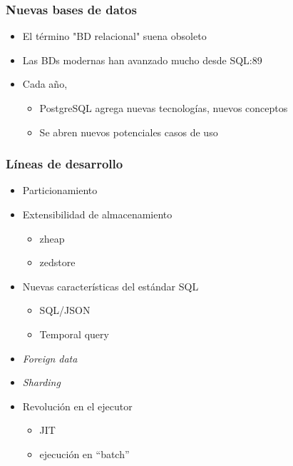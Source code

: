 \begin{frame}
\frametitle{Nuevas bases de datos}

\vfill
\begin{itemize}
\item El término "BD relacional" suena obsoleto
\item Las BDs modernas han avanzado mucho desde SQL:89
\item Cada año,
\begin{itemize}
\item PostgreSQL agrega nuevas tecnologías, nuevos conceptos
\item Se abren nuevos potenciales casos de uso
\end{itemize}
\end{itemize}
\vfill
\end{frame}

\begin{frame}
\frametitle{Líneas de desarrollo}

\begin{itemize}
\item Particionamiento

\item Extensibilidad de almacenamiento
\begin{itemize}
\item zheap
\item zedstore
\end{itemize}

\item Nuevas características del estándar SQL
\begin{itemize}
\item SQL/JSON
\item Temporal query
\end{itemize}

\item \textit{Foreign data}

\item \textit{Sharding}

\item Revolución en el ejecutor
\begin{itemize}
\item JIT
\item ejecución en ``batch''
\end{itemize}

\end{itemize}

\end{frame}

